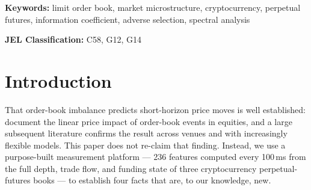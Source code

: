 \documentclass[11pt,a4paper]{article}
\theoremstyle{definition}
\theoremstyle{plain}
\begin{document}
\smallskip
\noindent\textbf{Keywords:} limit order book, market microstructure, cryptocurrency, perpetual
futures, information coefficient, adverse selection, spectral analysis

\smallskip
\noindent\textbf{JEL Classification:} C58, G12, G14

\tableofcontents
\bigskip

\section{Introduction}

That order-book imbalance predicts short-horizon price moves is
well established: \citet{cont2014} document the linear price impact of
order-book events in equities, and a large subsequent literature
confirms the result across venues and with increasingly flexible
models. This paper does not re-claim that finding. Instead, we use a
purpose-built measurement platform --- 236 features computed every
100\,ms from the full depth, trade flow, and funding state of three
cryptocurrency perpetual-futures books --- to establish four facts
that are, to our knowledge, new.
\end{document}
